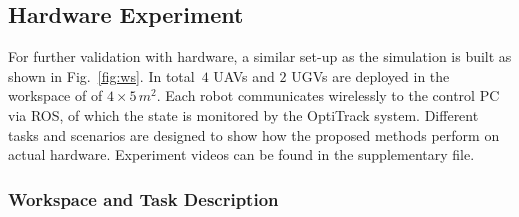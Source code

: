 \subsection{Hardware Experiment}\label{subsec:hardware-experiment}
For further validation with hardware,
a similar set-up as the simulation is built as shown in Fig.~\ref{fig:ws}.
In total~$4$ UAVs and $2$ UGVs are deployed in the workspace of of $4\times5\, m^2$.
Each robot communicates wirelessly to the control PC via ROS,
of which the state is monitored by the OptiTrack system.
Different tasks and scenarios are designed to show
how the proposed methods perform on actual hardware.
Experiment videos can be found in the supplementary file.

\subsubsection{Workspace and Task Description}\label{subsubsec:hw-ws-task}

